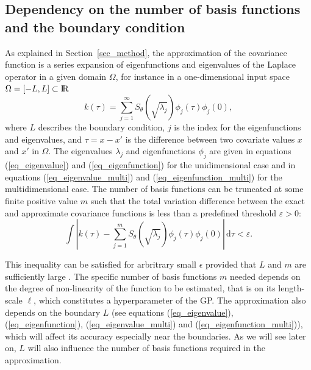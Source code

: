 \subsection{Dependency on the number of basis functions and the boundary condition} \label{subsec_dependency}

As explained in Section~\ref{sec_method}, the approximation of the covariance function is a series expansion of eigenfunctions and eigenvalues of the Laplace operator in a given domain $\Omega$, for instance in a one-dimensional input space $\Omega=[-L,L]\subset {\rm I\!R}$
%
\begin{equation*}
k(\tau) = \sum_{j=1}^{\infty} S_{\theta}(\sqrt{\lambda_j}) \phi_j(\tau) \phi_j(0), 
\end{equation*}
%
where $L$ describes the boundary condition, $j$ is the index for the eigenfunctions and eigenvalues, and $\tau=x-x'$ is the difference between two covariate values $x$ and $x'$ in $\Omega$. The eigenvalues $\lambda_j$ and eigenfunctions $\phi_j$ are given in equations (\ref{eq_eigenvalue}) and (\ref{eq_eigenfunction}) for the unidimensional case and in equations (\ref{eq_eigenvalue_multi}) and (\ref{eq_eigenfunction_multi}) for the multidimensional case. The number of basis functions can be truncated at some finite positive value $m$ such that the total variation difference between the exact and approximate covariance functions is less than a predefined threshold $\varepsilon > 0$:
%
\begin{equation}\label{eq_diff_covs}
 \int | k(\tau) - \sum_{j=1}^m S_{\theta}(\sqrt{\lambda_j}) \phi_j(\tau) \phi_j(0)|  \,\mathrm{d}\tau  < \varepsilon.
\end{equation}

This inequality can be satisfied for arbritrary small $\epsilon$ provided that $L$ and $m$ are sufficiently large \cite[Theorem 1 and 4]{solin2018hilbert}. 
The specific number of basis functions $m$ needed depends on the degree of non-linearity of the function to be estimated, that is on its length-scale $\ell$, which constitutes a hyperparameter of the GP. The approximation also depends on the boundary $L$ (see equations (\ref{eq_eigenvalue}), (\ref{eq_eigenfunction}), (\ref{eq_eigenvalue_multi}) and (\ref{eq_eigenfunction_multi})), which will affect its accuracy especially near the boundaries. As we will see later on, $L$ will also influence the number of basis functions required in the approximation.


